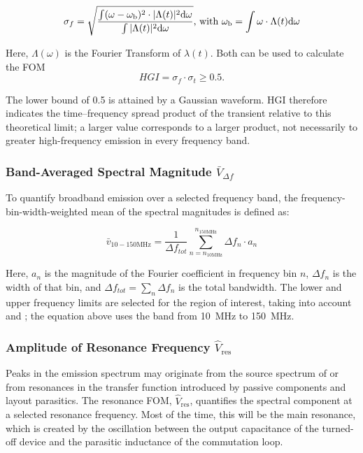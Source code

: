 \begin{equation}
\sigma_f = \sqrt{\frac{\int (\omega-{\omega}_{\mathrm{b}})^2 \cdot |\Lambda(t)|^2 \text{d}\omega}{\int |\Lambda(t)|^2 \text{d}\omega}}\text{, with } {\omega}_{\mathrm{b}} = \int \omega\cdot\Lambda(t) \text{d}\omega
\end{equation}

Here, $\Lambda(\omega)$ is the Fourier Transform of $\lambda(t)$.
Both can be used to calculate the FOM 
\begin{equation}
	HGI = \sigma_f \cdot \sigma_t \geq 0.5.
\end{equation}

The lower bound of 0.5 is attained by a Gaussian waveform. 
HGI therefore indicates the time--frequency spread product of the transient relative to this theoretical limit; a larger value corresponds to a larger product, not necessarily to greater high-frequency emission in every frequency band.

\subsubsection*{Band-Averaged Spectral Magnitude {\boldmath$\bar{V}_{\Delta f}$}}
To quantify broadband emission over a selected frequency band, the frequency-bin-width-weighted mean of the spectral magnitudes is defined as:

\begin{equation}
	\bar{v}_{10-150 \mathrm{MHz}} = \frac{1}{\Delta f_{tot}} \sum_{n = n_{10 \mathrm{MHz}}}^{n_{150 \mathrm{MHz}}} \Delta f_n \cdot a_n
\end{equation}

Here, $a_n$ is the magnitude of the Fourier coefficient in frequency bin $n$, $\Delta f_n$ is the width of that bin, and $\Delta f_{tot}=\sum_n\Delta f_n$ is the total bandwidth. 
The lower and upper frequency limits are selected for the region of interest, taking into account  and ; the equation above uses the band from \SI{10}{MHz} to \SI{150}{MHz}.

\subsubsection*{Amplitude of Resonance Frequency {\boldmath$\hat{V}_\mathrm{res}$}}
Peaks in the emission spectrum may originate from the source spectrum of  or from resonances in the transfer function introduced by passive components and layout parasitics. 
The resonance FOM, $\hat{V}_\mathrm{res}$, quantifies the spectral component at a selected resonance frequency.
Most of the time, this will be the main resonance, which is created by the oscillation between the output capacitance of the turned-off device and the parasitic inductance of the commutation loop.


